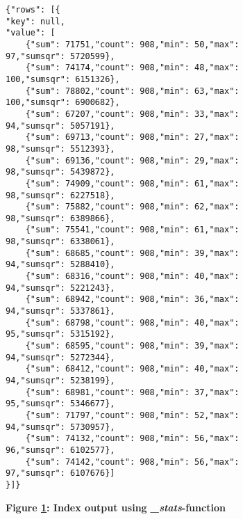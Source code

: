 \begin{figure}[H]
    \centering
    \begin{mdframed}
        \centering
        \begin{verbatim}
{"rows": [{
"key": null,    
"value": [
    {"sum": 71751,"count": 908,"min": 50,"max": 97,"sumsqr": 5720599},
    {"sum": 74174,"count": 908,"min": 48,"max": 100,"sumsqr": 6151326},
    {"sum": 78802,"count": 908,"min": 63,"max": 100,"sumsqr": 6900682},
    {"sum": 67207,"count": 908,"min": 33,"max": 94,"sumsqr": 5057191},
    {"sum": 69713,"count": 908,"min": 27,"max": 98,"sumsqr": 5512393},
    {"sum": 69136,"count": 908,"min": 29,"max": 98,"sumsqr": 5439872},
    {"sum": 74909,"count": 908,"min": 61,"max": 98,"sumsqr": 6227518},
    {"sum": 75882,"count": 908,"min": 62,"max": 98,"sumsqr": 6389866},
    {"sum": 75541,"count": 908,"min": 61,"max": 98,"sumsqr": 6338061},
    {"sum": 68685,"count": 908,"min": 39,"max": 94,"sumsqr": 5288410},
    {"sum": 68316,"count": 908,"min": 40,"max": 94,"sumsqr": 5221243},
    {"sum": 68942,"count": 908,"min": 36,"max": 94,"sumsqr": 5337861},
    {"sum": 68798,"count": 908,"min": 40,"max": 95,"sumsqr": 5315192},
    {"sum": 68595,"count": 908,"min": 39,"max": 94,"sumsqr": 5272344},
    {"sum": 68412,"count": 908,"min": 40,"max": 94,"sumsqr": 5238199},
    {"sum": 68981,"count": 908,"min": 37,"max": 95,"sumsqr": 5346677},
    {"sum": 71797,"count": 908,"min": 52,"max": 94,"sumsqr": 5730957},
    {"sum": 74132,"count": 908,"min": 56,"max": 96,"sumsqr": 6102577},
    {"sum": 74142,"count": 908,"min": 56,"max": 97,"sumsqr": 6107676}]
}]}      
        \end{verbatim}
    \end{mdframed}
    \caption[Index output using \textit{\_stats}-function]{\textbf{Figure \ref{fig-variance-reduce-output}: Index output using \textit{\_stats}-function}}
    \label{fig-variance-reduce-output}
\end{figure}
